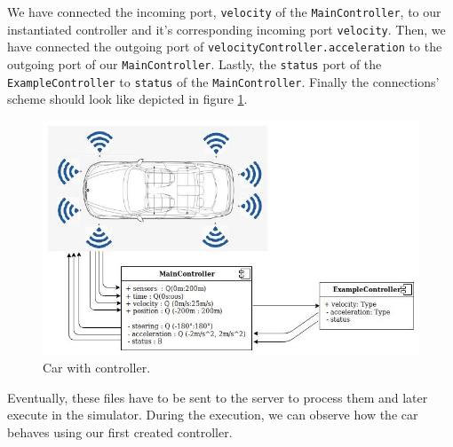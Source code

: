 \bigskip
We have connected the incoming port, \texttt{velocity} of the \texttt{MainController}, to our instantiated controller and it's corresponding incoming port \texttt{velocity}. Then, we have connected the outgoing port of \texttt{velocityController.acceleration} to the outgoing port of our \texttt{MainController}. Lastly, the \texttt{status} port of the \texttt{ExampleController} to \texttt{status} of the \texttt{MainController}.\newline
Finally the connections' scheme should look like depicted in figure \ref{fig:controller}.
\begin{figure}[h!]
    \centering
    \includegraphics[width=0.9\linewidth]{src/pic/car-with-controller}
    \caption{Car with controller.}
    \label{fig:controller}
\end{figure} \newline
Eventually, these files have to be sent to the server to process them and later execute in the simulator. During the execution, we can observe how the car behaves using our first created controller.

